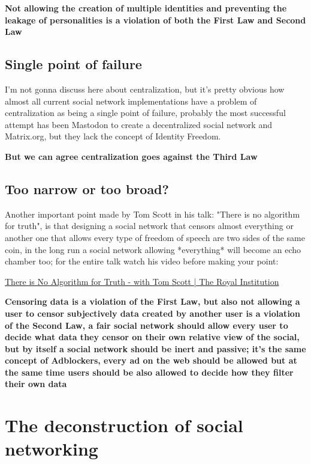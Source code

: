 \documentclass[12pt]{article}
\begin{document}
\textbf{Not allowing the creation of multiple identities and preventing the leakage of personalities is a violation of both the First Law and Second Law}

\subsection{Single point of failure}

I'm not gonna discuss here about centralization, but it's pretty obvious how almost all current social network implementations have a problem of centralization as being a single point of failure, probably the most successful attempt has been Mastodon to create a decentralized social network and Matrix.org, but they lack the concept of Identity Freedom.

\textbf{But we can agree centralization goes against the Third Law}


\subsection{Too narrow or too broad?}

Another important point made by Tom Scott in his talk: "There is no algorithm for truth", is that designing a social network that censors almost everything or another one that allows every type of freedom of speech are two sides of the same coin, in the long run a social network allowing *everything* will become an echo chamber too; for the entire talk watch his video before making your point:

\href{https://www.youtube.com/watch?v=leX541Dr2rU}{There is No Algorithm for Truth - with Tom Scott | 
The Royal Institution
}




\textbf{Censoring data is a violation of the First Law, but also not allowing a user to censor subjectively data created by another user is a violation of the Second Law, a fair social network should allow every user to decide what data they censor on their own relative view of the social, but by itself a social network should be inert and passive; it's the same concept of Adblockers, every ad on the web should be allowed but at the same time users should be also allowed to decide how they filter their own data}



\section{The deconstruction of social networking}
\end{document}

